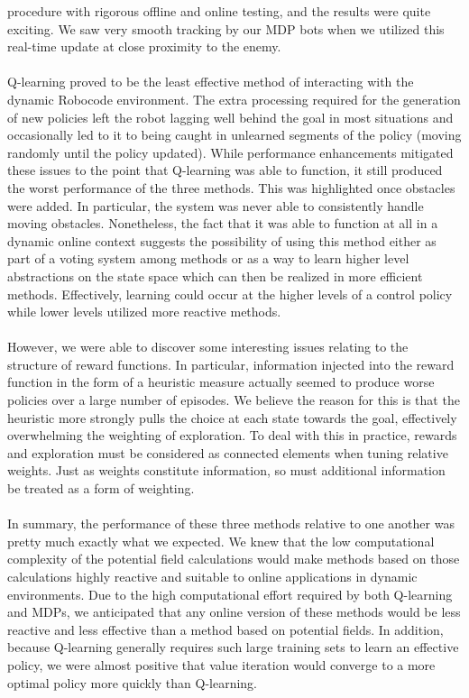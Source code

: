 \documentclass{aiaa-tc}%
\begin{document}
procedure with rigorous offline and online testing, and the results were quite exciting. We saw very smooth tracking by our MDP bots when we utilized this real-time update at close proximity to the enemy.\\ \\
Q-learning proved to be the least effective method of interacting
with the dynamic Robocode environment. The extra processing required for the generation
of new policies left the robot lagging well behind the goal in most
situations and occasionally led to it to being caught in unlearned
segments of the policy (moving randomly until the policy updated). While performance enhancements mitigated these issues to
the point that Q-learning was able to function, it
still produced the worst performance of the three
methods. This was highlighted once obstacles were
added. In particular, the system was never able to consistently handle
moving obstacles. Nonetheless, the fact that it was able to
function at all in a dynamic online context suggests the possibility of using this method either as part of a voting system among methods or as a way to learn higher level abstractions on the state space which can then be realized in more efficient methods. Effectively, learning could occur at the higher levels of a control policy while lower levels utilized more reactive methods. \\ \\
However, we were able to discover some interesting issues relating to the structure of reward functions. In particular, information injected into the reward function in the form of a heuristic measure actually seemed to produce worse policies over a large number of episodes. We believe the reason for this is that the heuristic more strongly pulls the choice at each state towards the goal, effectively overwhelming the weighting of exploration. To deal with this in practice, rewards and exploration must be considered as connected elements when tuning relative weights. Just as weights constitute information, so must additional information be treated as a form of weighting. \\ \\
In summary, the performance of these three methods relative to one another was pretty much exactly what we expected. We knew that the low computational complexity of the potential field calculations would make methods based on those calculations highly reactive and suitable to online applications in dynamic environments. Due to the high computational effort required by both Q-learning and MDPs, we anticipated that any online version of these methods would be less reactive and less effective than a method based on potential fields. In addition, because Q-learning generally requires such large training sets to learn an effective policy, we were almost positive that value iteration would converge to a more optimal policy more quickly than Q-learning. \\ \\
\end{document}
